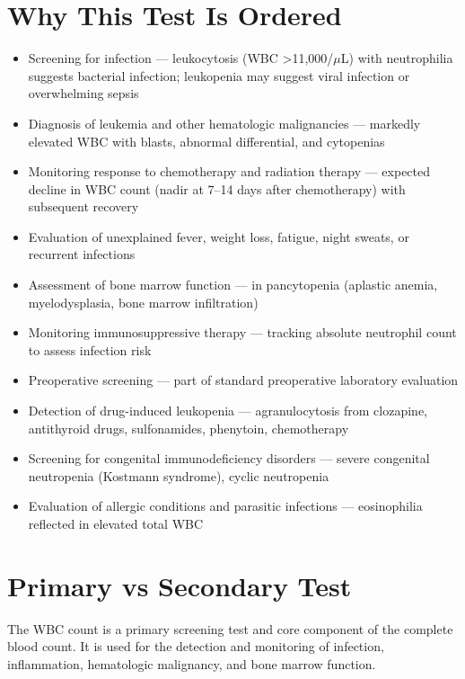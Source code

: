 \section*{Why This Test Is Ordered}
\begin{itemize}
  \item Screening for infection --- leukocytosis (WBC >11,000/$\mu$L) with neutrophilia suggests bacterial infection; leukopenia may suggest viral infection or overwhelming sepsis
  \item Diagnosis of leukemia and other hematologic malignancies --- markedly elevated WBC with blasts, abnormal differential, and cytopenias
  \item Monitoring response to chemotherapy and radiation therapy --- expected decline in WBC count (nadir at 7--14 days after chemotherapy) with subsequent recovery
  \item Evaluation of unexplained fever, weight loss, fatigue, night sweats, or recurrent infections
  \item Assessment of bone marrow function --- in pancytopenia (aplastic anemia, myelodysplasia, bone marrow infiltration)
  \item Monitoring immunosuppressive therapy --- tracking absolute neutrophil count to assess infection risk
  \item Preoperative screening --- part of standard preoperative laboratory evaluation
  \item Detection of drug-induced leukopenia --- agranulocytosis from clozapine, antithyroid drugs, sulfonamides, phenytoin, chemotherapy
  \item Screening for congenital immunodeficiency disorders --- severe congenital neutropenia (Kostmann syndrome), cyclic neutropenia
  \item Evaluation of allergic conditions and parasitic infections --- eosinophilia reflected in elevated total WBC
\end{itemize}

\section*{Primary vs Secondary Test}
The WBC count is a primary screening test and core component of the complete blood count. It is used for the detection and monitoring of infection, inflammation, hematologic malignancy, and bone marrow function.

